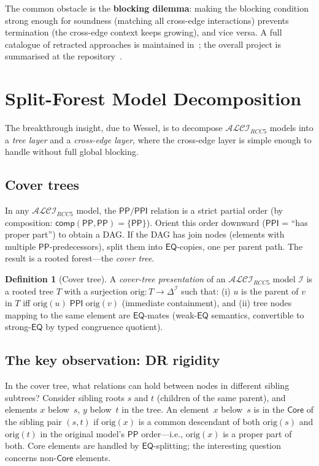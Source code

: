 \documentclass[
]{ceurart}
\theoremstyle{definition}
\newtheorem{definition}[theorem]{Definition}
\newcommand{\ALCIRCC}[1]{\ensuremath{\mathcal{ALCI}_{\mathit{RCC#1}}}}
\newcommand{\EQ}{\ensuremath{\mathsf{EQ}}}
\newcommand{\PP}{\ensuremath{\mathsf{PP}}}
\newcommand{\PPI}{\ensuremath{\mathsf{PPI}}}
\newcommand{\comp}{\ensuremath{\mathsf{comp}}}
\newcommand{\Core}{\ensuremath{\mathsf{Core}}}
\begin{document}
The common obstacle is the \textbf{blocking dilemma}: making the
blocking condition strong enough for soundness (matching all
cross-edge interactions) prevents termination (the cross-edge
context keeps growing), and vice versa.  A full catalogue of
retracted approaches is maintained
in~\cite{ALCIRCC5Outdated}; the overall project is summarised at
the repository~\cite{ALCIRCC5Repo}.

\section{Split-Forest Model Decomposition}
\label{sec:split-forest}

The breakthrough insight, due to Wessel, is to decompose
$\ALCIRCC{5}$ models into a \emph{tree layer} and a
\emph{cross-edge layer}, where the cross-edge layer is simple
enough to handle without full global blocking.

\subsection{Cover trees}

In any $\ALCIRCC{5}$ model, the $\PP/\PPI$ relation is a
strict partial order (by composition: $\comp(\PP,\PP) = \{\PP\}$).
Orient this order downward ($\PPI$ = ``has proper part'') to
obtain a DAG.  If the DAG has join nodes (elements with multiple
$\PP$-predecessors), split them into $\EQ$-copies, one per parent
path.  The result is a rooted forest---the \emph{cover tree}.

\begin{definition}[Cover tree]
A \emph{cover-tree presentation} of an $\ALCIRCC{5}$ model
$\mathcal{I}$ is a rooted tree $T$ with a surjection
$\mathrm{orig}: T \to \Delta^{\mathcal{I}}$ such that:
(i) $u$ is the parent of $v$ in $T$ iff
$\mathrm{orig}(u) \;\PPI\; \mathrm{orig}(v)$ (immediate containment),
and (ii) tree nodes mapping to the same element are $\EQ$-mates
(weak-$\EQ$ semantics, convertible to strong-$\EQ$ by typed
congruence quotient).
\end{definition}

\subsection{The key observation: DR rigidity}

In the cover tree, what relations can hold between nodes in
different sibling subtrees?  Consider sibling roots $s$ and $t$
(children of the same parent), and elements $x$ below~$s$, $y$
below~$t$ in the tree.
An element~$x$ below~$s$ is in the \emph{$\Core$} of the sibling
pair $(s,t)$ if $\mathrm{orig}(x)$ is a common descendant of both
$\mathrm{orig}(s)$ and $\mathrm{orig}(t)$ in the original model's
$\PP$ order---i.e., $\mathrm{orig}(x)$ is a proper part of both.
Core elements are handled by $\EQ$-splitting; the interesting
question concerns non-$\Core$ elements.
\end{document}
